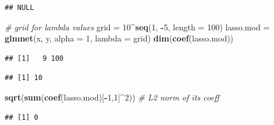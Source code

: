 \documentclass[]{article}
\newenvironment{Shaded}{\begin{snugshade}}{\end{snugshade}}
\newcommand{\KeywordTok}[1]{\textcolor[rgb]{0.13,0.29,0.53}{\textbf{#1}}}
\newcommand{\DataTypeTok}[1]{\textcolor[rgb]{0.13,0.29,0.53}{#1}}
\newcommand{\DecValTok}[1]{\textcolor[rgb]{0.00,0.00,0.81}{#1}}
\newcommand{\StringTok}[1]{\textcolor[rgb]{0.31,0.60,0.02}{#1}}
\newcommand{\CommentTok}[1]{\textcolor[rgb]{0.56,0.35,0.01}{\textit{#1}}}
\newcommand{\OperatorTok}[1]{\textcolor[rgb]{0.81,0.36,0.00}{\textbf{#1}}}
\newcommand{\NormalTok}[1]{#1}
\begin{document}
\begin{verbatim}
## NULL
\end{verbatim}

\begin{Shaded}
\begin{Highlighting}[]
\CommentTok{# grid for lambda values}
\NormalTok{grid =}\StringTok{ }\DecValTok{10}\OperatorTok{^}\KeywordTok{seq}\NormalTok{(}\DecValTok{1}\NormalTok{, }\OperatorTok{-}\DecValTok{5}\NormalTok{, }\DataTypeTok{length =} \DecValTok{100}\NormalTok{)}
\NormalTok{lasso.mod =}\StringTok{ }\KeywordTok{glmnet}\NormalTok{(x, y, }\DataTypeTok{alpha =} \DecValTok{1}\NormalTok{, }\DataTypeTok{lambda =}\NormalTok{ grid)}
\KeywordTok{dim}\NormalTok{(}\KeywordTok{coef}\NormalTok{(lasso.mod))}
\end{Highlighting}
\end{Shaded}

\begin{verbatim}
## [1]   9 100
\end{verbatim}

\begin{Shaded}
\end{Shaded}

\begin{verbatim}
## [1] 10
\end{verbatim}

\begin{Shaded}
\begin{Highlighting}[]
\KeywordTok{sqrt}\NormalTok{(}\KeywordTok{sum}\NormalTok{(}\KeywordTok{coef}\NormalTok{(lasso.mod)[}\OperatorTok{-}\DecValTok{1}\NormalTok{,}\DecValTok{1}\NormalTok{]}\OperatorTok{^}\DecValTok{2}\NormalTok{))   }\CommentTok{# L2 norm of its coeff}
\end{Highlighting}
\end{Shaded}

\begin{verbatim}
## [1] 0
\end{verbatim}

\begin{Shaded}
\end{Shaded}
\end{document}
